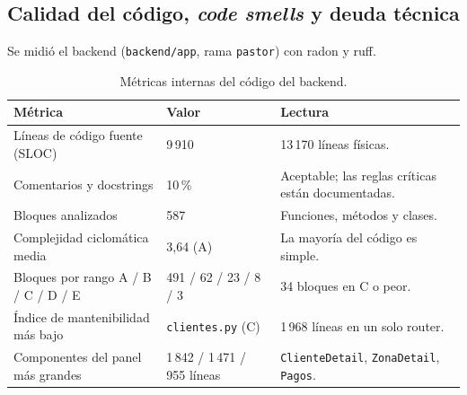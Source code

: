 \subsection{Calidad del código, \emph{code smells} y deuda técnica}

Se midió el backend (\texttt{backend/app}, rama \texttt{pastor}) con radon y ruff.

\begin{table}[H]
\centering
\caption{Métricas internas del código del backend.}
\label{tab:ce02-e4-codigo}
\small
\begin{tabularx}{\textwidth}{L{5.2cm}C{2.2cm}X}
\toprule
\textbf{Métrica} & \textbf{Valor} & \textbf{Lectura} \\
\midrule
Líneas de código fuente (SLOC) & 9\,910 & 13\,170 líneas físicas. \\
Comentarios y docstrings & 10\,\% & Aceptable; las reglas críticas están documentadas. \\
Bloques analizados & 587 & Funciones, métodos y clases. \\
Complejidad ciclomática media & 3,64 (A) & La mayoría del código es simple. \\
Bloques por rango A / B / C / D / E & 491 / 62 / 23 / 8 / 3 & 34 bloques en C o peor. \\
Índice de mantenibilidad más bajo & \texttt{clientes.py} (C) & 1\,968 líneas en un solo router. \\
Componentes del panel más grandes & 1\,842 / 1\,471 / 955 líneas & \texttt{ClienteDetail}, \texttt{ZonaDetail}, \texttt{Pagos}. \\
\bottomrule
\end{tabularx}
\end{table}

